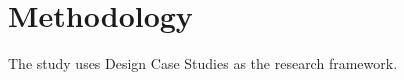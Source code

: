 \chapter{Methodology} 

The study uses Design Case Studies \cite{dcs} as the research framework. 


